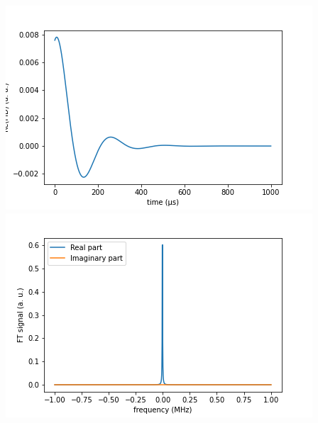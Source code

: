 \documentclass[10pt]{beamer}
\begin{document}
\begin{frame}
\begin{columns}[T]
\begin{column}{.5\textwidth}
\begin{column}{.5\textwidth}
\end{column}
\end{column}
\begin{column}{.5\textwidth}
\includegraphics[width=\textwidth]{./spin1-2/21uncorrelated_pure_no_interactions/FIDSignal.png}
\includegraphics[width=\textwidth]{./spin1-2/21uncorrelated_pure_no_interactions/FTSignal.png}
\end{column}
\end{columns}
\end{frame}
\end{document}
